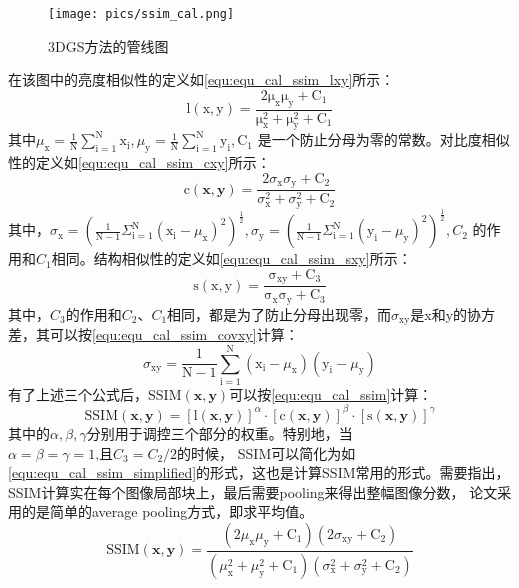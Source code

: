 \begin{figure}[htbp]
    \centering
    \texttt{[image: pics/ssim\_cal.png]}
    \caption{\label{fig:img_ssim_cal}3DGS方法的管线图}
\end{figure}
在该图中的亮度相似性的定义如\autoref{equ:equ_cal_ssim_lxy}所示：
\begin{equation}
    \label{equ:equ_cal_ssim_lxy}
    \mathrm{l(x,y)=\frac{2\mu_x\mu_y+C_1}{\mu_x^2+\mu_y^2+C_1}}
\end{equation}
其中\(\mu_\mathrm{x}=\frac{1}{\mathrm{N}}\sum_{\mathrm{i}=1}^\mathrm{N} \mathrm{x_i}, \mu_\mathrm{y}=\frac{1}{\mathrm{N}}\sum_{\mathrm{i}=1}^\mathrm{N} \mathrm{y_i}, \mathrm{C_1}\)
是一个防止分母为零的常数。对比度相似性的定义如\autoref{equ:equ_cal_ssim_cxy}所示：
\begin{equation}
    \label{equ:equ_cal_ssim_cxy}
    \mathrm{c}(\mathbf{x},\mathbf{y})=\frac{2\sigma_\mathrm{x}\sigma_\mathrm{y}+\mathrm{C}_2}{\sigma_\mathrm{x}^2+\sigma_\mathrm{y}^2+\mathrm{C}_2}
\end{equation}
其中，\(\sigma_{\mathrm{x}}=\left(\frac1{\mathrm{N}-1}\Sigma_{\mathrm{i}=1}^{\mathrm{N}}\left(\mathrm{x}_{\mathrm{i}}-\mu_{\mathrm{x}}\right)^{2}\right)^{\frac12},\sigma_{\mathrm{y}}=\left(\frac1{\mathrm{N}-1}\Sigma_{\mathrm{i}=1}^{\mathrm{N}}\left(\mathrm{y}_{\mathrm{i}}-\mu_{\mathrm{y}}\right)^{2}\right)^{\frac12},C_{2}\)
的作用和\(C_1\)相同。结构相似性的定义如\autoref{equ:equ_cal_ssim_sxy}所示：
\begin{equation}
    \label{equ:equ_cal_ssim_sxy}
    \mathrm{s(x,y)=\frac{\sigma_{xy}+C_3}{\sigma_x\sigma_y+C_3}}
\end{equation}
其中，\(C_3\)的作用和\(C_2、C_1\)相同，都是为了防止分母出现零，而\(\sigma_{\mathrm{xy}}\)是x和y的协方差，其可以按\autoref{equ:equ_cal_ssim_covxy}计算：
\begin{equation}
    \label{equ:equ_cal_ssim_covxy}
    \sigma_{\mathrm{xy}}=\frac1{\mathrm{N}-1}\sum_{\mathrm{i}=1}^{\mathrm{N}}(\mathrm{x_i}-\mu_\mathrm{x})(\mathrm{y_i}-\mu_\mathrm{y})
\end{equation}
有了上述三个公式后，\(\mathrm{SSIM}(\mathbf{x},\mathbf{y})\)可以按\autoref{equ:equ_cal_ssim}计算：
\begin{equation}
    \label{equ:equ_cal_ssim}
    \mathrm{SSIM}(\mathbf{x},\mathbf{y})=[\mathrm{l}(\mathbf{x},\mathbf{y})]^\alpha\cdot[\mathrm{c}(\mathbf{x},\mathbf{y})]^\beta\cdot[\mathrm{s}(\mathbf{x},\mathbf{y})]^\gamma 
\end{equation}
其中的\(\alpha,\beta,\gamma \)分别用于调控三个部分的权重。特别地，当\(\alpha{=}\beta{=}\gamma{=}1\text{,且}C_3=C_2/2\)的时候，
SSIM可以简化为如\autoref{equ:equ_cal_ssim_simplified}的形式，这也是计算SSIM常用的形式。需要指出，SSIM计算实在每个图像局部块上，最后需要pooling来得出整幅图像分数，
论文采用的是简单的average pooling方式，即求平均值。
\begin{equation}
    \label{equ:equ_cal_ssim_simplified}
    \mathrm{SSIM}(\mathbf{x},\mathbf{y})=\frac{(2\mu_\mathrm{x}\mu_\mathrm{y}+\mathrm{C}_1)(2\sigma_\mathrm{xy}+\mathrm{C}_2)}{(\mu_\mathrm{x}^2+\mu_\mathrm{y}^2+\mathrm{C}_1)(\sigma_\mathrm{x}^2+\sigma_\mathrm{y}^2+\mathrm{C}_2)}
\end{equation}

